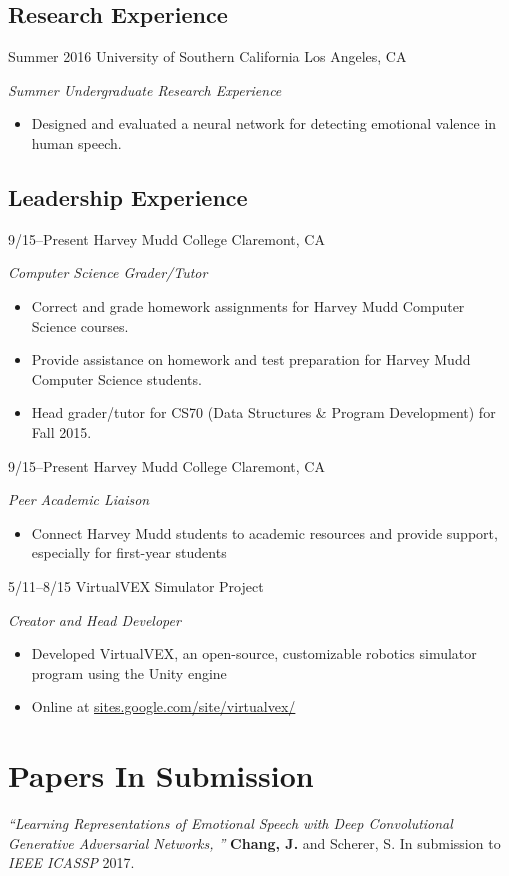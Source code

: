 \documentclass[]{friggeri-cv} %
\begin{document}
\subsection{Research Experience}

\begin{entrylist}

\entry
{Summer 2016}
{University of Southern California}
{Los Angeles, CA}
{\emph{Summer Undergraduate Research Experience}
\begin{itemize}
\item Designed and evaluated a neural network for detecting emotional valence in human speech.
\end{itemize}}

\end{entrylist}

\subsection{Leadership Experience}

\begin{entrylist}

\entry
{9/15--Present}
{Harvey Mudd College}
{Claremont, CA}
{\emph{Computer Science Grader/Tutor}
\begin{itemize}
\item Correct and grade homework assignments for Harvey Mudd Computer Science courses.
\item Provide assistance on homework and test preparation for Harvey Mudd Computer Science students.
\item Head grader/tutor for CS70 (Data Structures \& Program Development) for Fall 2015.
\end{itemize}}


\entry
{9/15--Present}
{Harvey Mudd College}
{Claremont, CA}
{\emph{Peer Academic Liaison}
\begin{itemize}
\item Connect Harvey Mudd students to academic resources and provide support, especially for first-year students
\end{itemize}}


\entry
{5/11--8/15}
{VirtualVEX Simulator Project}
{}
{\emph{Creator and Head Developer}
\begin{itemize}
\item Developed VirtualVEX, an open-source, customizable robotics simulator program using the Unity engine
\item Online at \href{https://sites.google.com/site/virtualvex/}{sites.google.com/site/virtualvex/}
\end{itemize}}

\end{entrylist}

\section{Papers In Submission}

\emph{``Learning Representations of Emotional Speech with Deep
Convolutional Generative Adversarial Networks, ''} \textbf{Chang, J.} and
Scherer, S. In submission to \emph{IEEE ICASSP} 2017.
\end{document}
